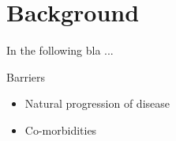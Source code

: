 \section{Background}

In the following bla ...  \cite{ryanavatars}


Barriers 
\begin{itemize}
\item Natural progression of disease 
\item Co-morbidities 
\end{itemize}